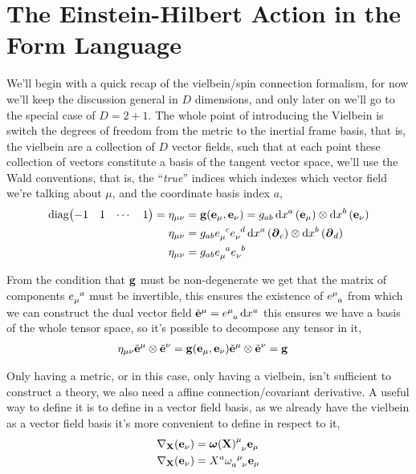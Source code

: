 \section{The Einstein-Hilbert Action in the Form Language}

We'll begin with a quick recap of the vielbein/spin connection formalism, for now we'll keep the discussion general in $D$ dimensions, and 
only later on we'll go to the special case of $D=2+1$. The whole point of introducing the Vielbein is switch the degrees of freedom from the 
metric to the inertial frame basis, that is, the vielbein are a collection of $D$ vector fields, such that at each point these collection of 
vectors constitute a basis of the tangent vector space, we'll use the Wald conventions, that is, the ``\textit{true}'' indices which indexes 
which vector field we're talking about $\mu$, and the coordinate basis index $a$,
\begin{align*}
    \textnormal{diag}\mqty(-1& 1&\cdots&1)=\eta_{\mu\nu}&=\vb g\qty(\vb e_\mu,\vb e_\nu)=g_{ab}\dd{x^a}\qty(\vb e_\mu)\otimes\dd{x^b}\qty(\vb e_\nu)\\
    \eta_{\mu\nu}&=g_{ab}\tensor{e}{_\mu^c}\tensor{e}{_\nu^d}\dd{x^a}\qty(\boldsymbol\partial_c)\otimes\dd{x^b}\qty(\boldsymbol\partial_d)\\
    \eta_{\mu\nu}&=g_{ab}\tensor{e}{_\mu^a}\tensor{e}{_\nu^b}
\end{align*}

From the condition that $\vb g$ must be non-degenerate we get that the matrix of components $\tensor{e}{_\mu^a}$ must be invertible, this ensures 
the existence of $\tensor{e}{^\mu_a}$ from which we can construct the dual vector field $\tilde{\vb e}^\mu=\tensor{e}{^\mu_a}\dd{x^a}$ this ensures 
we have a basis of the whole tensor space, so it's possible to decompose any tensor in it,
\begin{align*}
    \eta_{\mu\nu}\tilde{\vb e}^\mu\otimes\tilde{\vb e}^\nu&=\vb g\qty(\vb e_\mu,\vb e_\nu)\tilde{\vb e}^\mu\otimes\tilde{\vb e}^\nu=\vb g
\end{align*}

Only having a metric, or in this case, only having a vielbein, isn't sufficient to construct a theory, we also need a affine connection/covariant 
derivative. A useful way to define it is to define in a vector field basis, as we already have the vielbein as a vector field basis it's more 
convenient to define in respect to it,
\begin{align*}
    \nabla_{\vb X}\qty(\vb e_\nu)&=\tensor{{\boldsymbol\omega(\vb X)}}{^\mu_\nu}\vb e_\mu\\
    \nabla_{\vb X}\qty(\vb e_\nu)&=X^a\tensor{\omega}{_a^\mu_\nu}\vb e_\mu
\end{align*}

